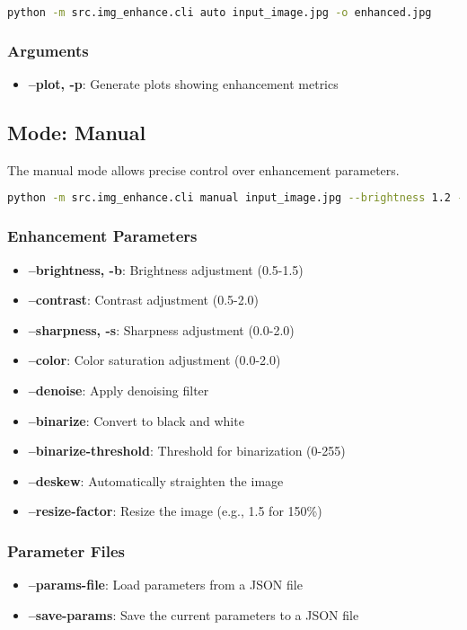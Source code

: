 \begin{lstlisting}[language=bash]
python -m src.img_enhance.cli auto input_image.jpg -o enhanced.jpg
\end{lstlisting}

\subsubsection{Arguments}
\begin{itemize}
  \item \textbf{--plot, -p}: Generate plots showing enhancement metrics
\end{itemize}

\subsection{Mode: Manual}

The manual mode allows precise control over enhancement parameters.

\begin{lstlisting}[language=bash]
python -m src.img_enhance.cli manual input_image.jpg --brightness 1.2 --contrast 1.5 --binarize
\end{lstlisting}

\subsubsection{Enhancement Parameters}
\begin{itemize}
  \item \textbf{--brightness, -b}: Brightness adjustment (0.5-1.5)
  \item \textbf{--contrast}: Contrast adjustment (0.5-2.0)
  \item \textbf{--sharpness, -s}: Sharpness adjustment (0.0-2.0)
  \item \textbf{--color}: Color saturation adjustment (0.0-2.0)
  \item \textbf{--denoise}: Apply denoising filter
  \item \textbf{--binarize}: Convert to black and white
  \item \textbf{--binarize-threshold}: Threshold for binarization (0-255)
  \item \textbf{--deskew}: Automatically straighten the image
  \item \textbf{--resize-factor}: Resize the image (e.g., 1.5 for 150\%)
\end{itemize}

\subsubsection{Parameter Files}
\begin{itemize}
  \item \textbf{--params-file}: Load parameters from a JSON file
  \item \textbf{--save-params}: Save the current parameters to a JSON file
\end{itemize}


